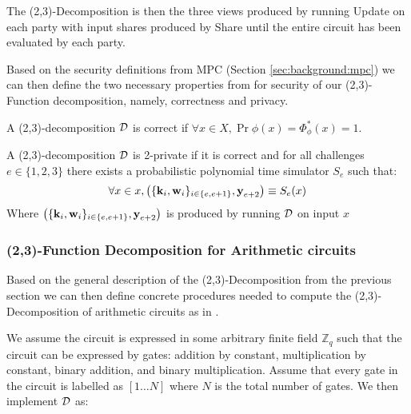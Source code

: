 The (2,3)-Decomposition is then the three views produced by running Update on
each party with input shares produced by Share until the entire circuit has been
evaluated by each party.

Based on the security definitions from MPC (Section \ref{sec:background:mpc}) we
can then define the two necessary properties from \cite{zkboo} for security of
our (2,3)-Function decomposition, namely, correctness and privacy.


\begin{definition}[Correctness]
\label{def:decomp_correctness}
A (2,3)-decomposition $\mathcal{D}$ is correct if $\forall x \in X, \Pr{\phi(x) = \Phi_{\phi}^{*}(x)} = 1$.
\end{definition}

\begin{definition}[Privacy]
\label{def:decomp_privacy}
A (2,3)-decomposition $\mathcal{D}$ is 2-private if it is correct and for all challenges
$e \in \{1,2,3\}$ there exists a probabilistic polynomial time simulator $S_{e}$
such that:
\[
  \forall x \in x, \left(\{\textbf{k}_{i}, \textbf{w}_{i} \}_{i \in \{e, e+1\}}, \textbf{y}_{e+2} \right)
  \equiv S_{e}(x)
\]
Where $\left(\{\textbf{k}_{i}, \textbf{w}_{i} \}_{i \in \{e, e+1\}}, \textbf{y}_{e+2}
\right)$ is produced by running $\mathcal{D}$ on input $x$
\end{definition}

\subsubsection{(2,3)-Function Decomposition for Arithmetic circuits}
Based on the general description of the (2,3)-Decomposition from the previous
section we can then define concrete procedures needed to compute the
(2,3)-Decomposition of arithmetic circuits as in \citet{zkboo}.

We assume the circuit is expressed in some arbitrary finite field
$\mathbb{Z}_{q}$ such that the circuit can be expressed by gates: addition by constant,
multiplication by constant, binary addition, and binary multiplication.
Assume that every gate in the circuit is labelled as $[1 \dots N]$ where $N$ is
the total number of gates.
We then implement $\mathcal{D}$ as:

